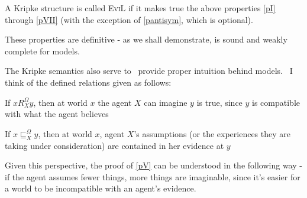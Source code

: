 \begin{definition}
A Kripke structure is called \textsc{EviL} if it makes true the
  above properties \ref{pI} through \ref{pVII} (with the exception of \ref{pantisym}, which is optional).
\end{definition}

These properties are definitive - as we shall demonstrate,  is
sound and weakly complete for  models.

The Kripke semantics also serve to \ provide proper intuition behind
 models. \ I think of the defined relations given as follows:
\begin{itemizedot}
  \item If $x R^{\Omega}_X y$, then at world $x$ the agent $X$ can imagine $y$
  is true, since $y$ is compatible with what the agent believes 
  \item If $x \sqsubseteq^{\Omega}_X y$, then at world $x$, agent $X$'s
  assumptions (or the experiences they are taking under consideration) are
  contained in her evidence at $y$
\end{itemizedot}
Given this perspective, the proof of \ref{pV} can be understood in the
following way - if the agent assumes fewer things, more things are imaginable,
since it's easier for a world to be incompatible with an agent's evidence.

